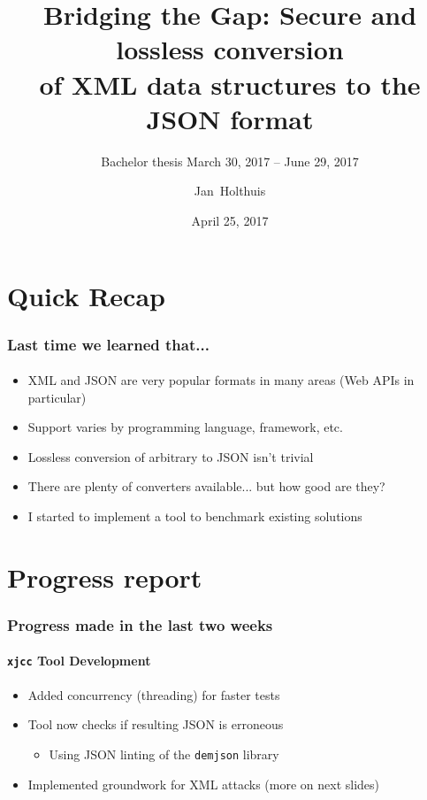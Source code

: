 \documentclass[
    alternativetitlepage=alternativ,
    cornerlogo=hgi_nds_logo2,
    sectionoverview,
]{rubpresentation}
\title[XML/JSON conversions]
{Bridging the Gap: Secure and lossless conversion\\ of XML data structures to the JSON format}
\subtitle{\small Bachelor thesis \hspace{3mm}{\scriptsize $\blacksquare$}\hspace{3mm} March 30, 2017 -- June 29, 2017}
\author[Holthuis]{Jan~Holthuis}
\institute[Advisors]
{%
Advisors: Dennis Felsch \& Paul Rösler
}
\date{April 25, 2017}
\begin{document}
\frame[plain]{\titlepage}




\section{Quick Recap}

\begin{frame}
    \frametitle{Last time we learned that...}
    \framesubtitle{}
    \begin{itemize}
        \item{} XML and JSON are very popular formats in many areas (Web APIs in particular)
        \item{} Support varies by programming language, framework, etc.
        \item{} Lossless conversion of arbitrary to JSON isn't trivial
        \item{} There are plenty of converters available... but how good are they?
        \item{} I started to implement a tool to benchmark existing solutions
    \end{itemize}

\end{frame}


\section{Progress report}

\begin{frame}
    \frametitle{Progress made in the last two weeks}
    \framesubtitle{\texttt{xjcc} Tool Development}
    \begin{itemize}
        \item{} Added concurrency (threading) for faster tests
        \item{} Tool now checks if resulting JSON is erroneous
        \begin{itemize}
            \item{} Using JSON linting of the \texttt{demjson} library
        \end{itemize}
        \item{} Implemented groundwork for XML attacks (more on next slides)
    \end{itemize}
\end{frame}
\end{document}
